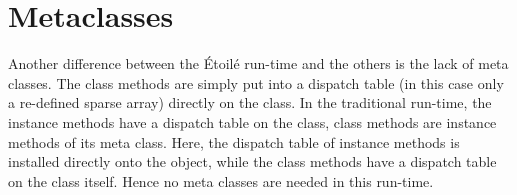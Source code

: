 \section{Metaclasses}

Another difference between the \'Etoil\'e run-time and the others is the lack of meta classes. The class methods are simply put into a dispatch table (in this case only a re-defined sparse array) directly on the class. In the traditional run-time, the instance methods have a dispatch table on the class, class methods are instance methods of its meta class. Here, the dispatch table of instance methods is installed directly onto the object, while the class methods have a dispatch table on the class itself. Hence no meta classes are needed in this run-time.

